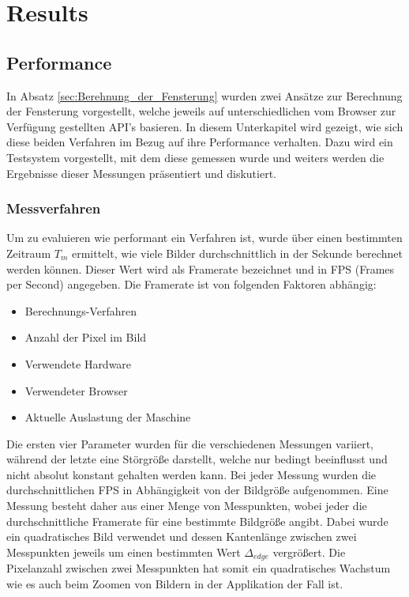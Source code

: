 
\section{Results}
\label{sec:results}

\subsection{Performance}
\label{sec:Performance}

In Absatz \ref{sec:Berehnung_der_Fensterung} wurden zwei Ansätze zur Berechnung der Fensterung vorgestellt,
welche jeweils auf unterschiedlichen vom Browser zur Verfügung gestellten API's basieren.
In diesem Unterkapitel wird gezeigt, wie sich diese beiden Verfahren im Bezug auf ihre Performance verhalten.
Dazu wird ein Testsystem vorgestellt, mit dem diese gemessen wurde und weiters werden die Ergebnisse dieser Messungen präsentiert und diskutiert.

\subsubsection{Messverfahren}
Um zu evaluieren wie performant ein Verfahren ist,
wurde über einen bestimmten Zeitraum $T_m$ ermittelt, wie viele Bilder durchschnittlich in der Sekunde berechnet werden können.
Dieser Wert wird als Framerate bezeichnet und in FPS (Frames per Second) angegeben.
Die Framerate ist von folgenden Faktoren abhängig:
\begin{itemize}
	\item Berechnungs-Verfahren
	\item Anzahl der Pixel im Bild
	\item Verwendete Hardware
	\item Verwendeter Browser
	\item Aktuelle Auslastung der Maschine
\end{itemize}
Die ersten vier Parameter wurden für die verschiedenen Messungen variiert, während der letzte eine Störgröße darstellt, welche nur bedingt beeinflusst und nicht absolut konstant gehalten werden kann.
Bei jeder Messung wurden die durchschnittlichen FPS in Abhängigkeit von der Bildgröße aufgenommen.
Eine Messung besteht daher aus einer Menge von Messpunkten, wobei jeder die durchschnittliche Framerate für eine bestimmte Bildgröße angibt.
Dabei wurde ein quadratisches Bild verwendet und dessen Kantenlänge zwischen zwei Messpunkten jeweils um einen bestimmten Wert $\Delta_{edge}$ vergrößert.
Die Pixelanzahl zwischen zwei Messpunkten hat somit ein quadratisches Wachstum wie es auch beim Zoomen von Bildern in der Applikation der Fall ist.


